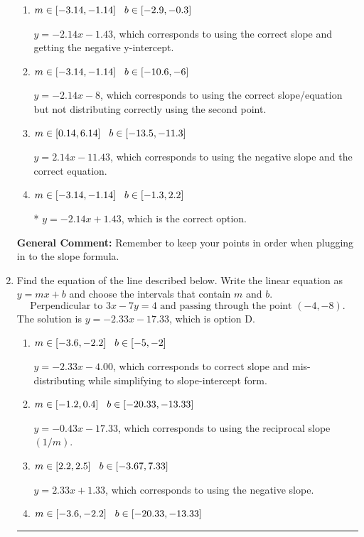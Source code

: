 \documentclass{extbook}[14pt]
\newcommand{\litem}[1]{\item #1

\rule{\textwidth}{0.4pt}}
\begin{document}
\begin{enumerate}
{\begin{enumerate}[label=\Alph*.]
 $y = -2.14x + 14$, which corresponds to using the correct slope/equation but not distributing correctly using the first point.
\item \( m \in [-3.14, -1.14] \hspace*{3mm} b \in [-2.9, -0.3] \)

 $y = -2.14x -1.43$, which corresponds to using the correct slope and getting the negative y-intercept.
\item \( m \in [-3.14, -1.14] \hspace*{3mm} b \in [-10.6, -6] \)

 $y = -2.14x -8$, which corresponds to using the correct slope/equation but not distributing correctly using the second point.
\item \( m \in [0.14, 6.14] \hspace*{3mm} b \in [-13.5, -11.3] \)

 $y = 2.14x -11.43$, which corresponds to using the negative slope and the correct equation.
\item \( m \in [-3.14, -1.14] \hspace*{3mm} b \in [-1.3, 2.2] \)

* $y = -2.14x + 1.43$, which is the correct option.
\end{enumerate}

\textbf{General Comment:} Remember to keep your points in order when plugging in to the slope formula.
}
\litem{
Find the equation of the line described below. Write the linear equation as $ y=mx+b $ and choose the intervals that contain $m$ and $b$.
\[ \text{Perpendicular to } 3 x - 7 y = 4 \text{ and passing through the point } (-4, -8). \]The solution is \( y = -2.33x - 17.33 \), which is option D.\begin{enumerate}[label=\Alph*.]
\item \( m \in [-3.6, -2.2] \hspace*{3mm} b \in [-5, -2] \)

 $y = -2.33x - 4.00$, which corresponds to correct slope and mis-distributing while simplifying to slope-intercept form.
\item \( m \in [-1.2, 0.4] \hspace*{3mm} b \in [-20.33, -13.33] \)

 $y = -0.43x - 17.33$, which corresponds to using the reciprocal slope $(1/m)$.
\item \( m \in [2.2, 2.5] \hspace*{3mm} b \in [-3.67, 7.33] \)

 $y = 2.33x + 1.33$, which corresponds to using the negative slope.
\item \( m \in [-3.6, -2.2] \hspace*{3mm} b \in [-20.33, -13.33] \)


\end{enumerate}}
\end{enumerate}
\end{document}
